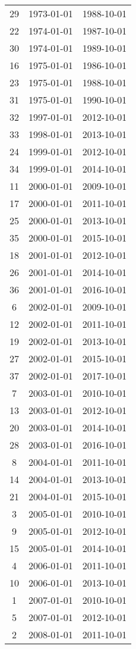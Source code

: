 % 
\begin{tabular}{ccc}
  \hline
  \hline
29 & 1973-01-01 & 1988-10-01 \\ 
  22 & 1974-01-01 & 1987-10-01 \\ 
  30 & 1974-01-01 & 1989-10-01 \\ 
  16 & 1975-01-01 & 1986-10-01 \\ 
  23 & 1975-01-01 & 1988-10-01 \\ 
  31 & 1975-01-01 & 1990-10-01 \\ 
  32 & 1997-01-01 & 2012-10-01 \\ 
  33 & 1998-01-01 & 2013-10-01 \\ 
  24 & 1999-01-01 & 2012-10-01 \\ 
  34 & 1999-01-01 & 2014-10-01 \\ 
  11 & 2000-01-01 & 2009-10-01 \\ 
  17 & 2000-01-01 & 2011-10-01 \\ 
  25 & 2000-01-01 & 2013-10-01 \\ 
  35 & 2000-01-01 & 2015-10-01 \\ 
  18 & 2001-01-01 & 2012-10-01 \\ 
  26 & 2001-01-01 & 2014-10-01 \\ 
  36 & 2001-01-01 & 2016-10-01 \\ 
  6 & 2002-01-01 & 2009-10-01 \\ 
  12 & 2002-01-01 & 2011-10-01 \\ 
  19 & 2002-01-01 & 2013-10-01 \\ 
  27 & 2002-01-01 & 2015-10-01 \\ 
  37 & 2002-01-01 & 2017-10-01 \\ 
  7 & 2003-01-01 & 2010-10-01 \\ 
  13 & 2003-01-01 & 2012-10-01 \\ 
  20 & 2003-01-01 & 2014-10-01 \\ 
  28 & 2003-01-01 & 2016-10-01 \\ 
  8 & 2004-01-01 & 2011-10-01 \\ 
  14 & 2004-01-01 & 2013-10-01 \\ 
  21 & 2004-01-01 & 2015-10-01 \\ 
  3 & 2005-01-01 & 2010-10-01 \\ 
  9 & 2005-01-01 & 2012-10-01 \\ 
  15 & 2005-01-01 & 2014-10-01 \\ 
  4 & 2006-01-01 & 2011-10-01 \\ 
  10 & 2006-01-01 & 2013-10-01 \\ 
  1 & 2007-01-01 & 2010-10-01 \\ 
  5 & 2007-01-01 & 2012-10-01 \\ 
  2 & 2008-01-01 & 2011-10-01 \\ 
   \hline
\end{tabular}
